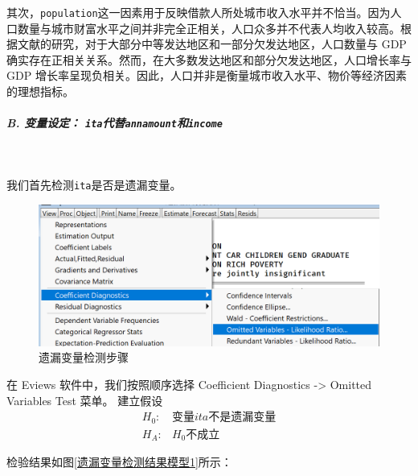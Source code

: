 \documentclass[13.5pt,hyperref,a4paper,UTF8]{ctexart}
\begin{document}
其次，\texttt{population}这一因素用于反映借款人所处城市收入水平并不恰当。因为人口数量与城市财富水平之间并非完全正相关，人口众多并不代表人均收入较高。根据文献\cite{中国省级人口增长率和GDP增长率及其相关关系研究}的研究，对于大部分中等发达地区和一部分欠发达地区，人口数量与 GDP 确实存在正相关关系。然而，在大多数发达地区和部分欠发达地区，人口增长率与 GDP 增长率呈现负相关。因此，人口并非是衡量城市收入水平、物价等经济因素的理想指标。

\subparagraph {B. 变量设定： \texttt{ita}代替\texttt{annamount}和\texttt{income}}
\

我们首先检测\texttt{ita}是否是遗漏变量。
\begin{figure}[H]
    \centering
    \includegraphics[width=0.5\linewidth]{figures//3回归//回归1/遗漏变量.png}
    \caption{遗漏变量检测步骤}
    \label{遗漏变量检测步骤模型1}
\end{figure}

在 Eviews 软件中，我们按照顺序选择 Coefficient Diagnostics -> Omitted Variables Test 菜单。
建立假设
\begin{equation}
    \begin{split}
        H_0:& 变量ita不是遗漏变量 \\
        H_A:& H_0不成立 \nonumber
    \end{split}
\end{equation}

检验结果如图\ref{遗漏变量检测结果模型1}所示：
\end{document}
